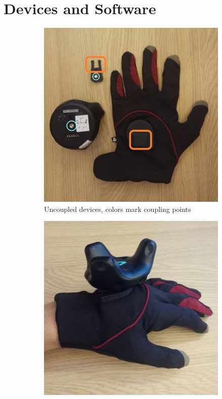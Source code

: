 \documentclass[hyperref, bachelorofscience]{cgvpub}
\begin{document}
\section{Devices and Software}
\begin{figure}[b!]
	\begin{subfigure}{.49\linewidth}
		\includegraphics[width=\linewidth]{../pics/devices_uncoupled}
		\caption{Uncoupled devices, colors mark coupling points}
		\label{fig:devices:unc}
	\end{subfigure}
	\hfill
	\begin{subfigure}{.49\linewidth}
		\includegraphics[width=\linewidth]{../pics/devices_coupled}

\end{subfigure}
\end{figure}
\end{document}
